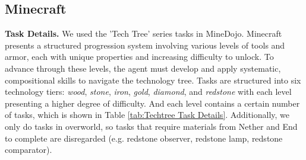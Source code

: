 \documentclass{article} %
\begin{document}
\subsection{Minecraft}
\label{sec:Minecraft Experiment Details}

\textbf{Task Details.} 
We used the 'Tech Tree' series tasks in MineDojo. Minecraft presents a structured progression system involving various levels of tools and armor, each with unique properties and increasing difficulty to unlock. To advance through these levels, the agent must develop and apply systematic, compositional skills to navigate the technology tree. 
Tasks are structured into six technology tiers: \textit{wood}, \textit{stone}, \textit{iron}, \textit{gold}, \textit{diamond}, and \textit{redstone} with each level presenting a higher degree of difficulty. And each level contains a certain number of tasks, which is shown in Table \ref{tab:Techtree Task Details}. Additionally, we only do tasks in overworld, so tasks that require materials from Nether and End to complete are disregarded (e.g. redstone observer, redstone lamp, redstone comparator).
\end{document}
